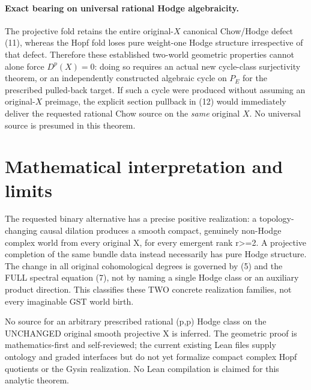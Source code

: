 \documentclass[11pt]{article}
\begin{document}
\paragraph{Exact bearing on universal rational Hodge algebraicity.}
The projective fold retains the entire original-$X$ canonical
Chow/Hodge defect (11), whereas the Hopf fold loses pure
weight-one Hodge structure irrespective of that defect.
Therefore these established two-world geometric properties cannot
alone force $D^p(X)=0$: doing so requires an actual new
cycle-class surjectivity theorem, or an independently constructed
algebraic cycle on $P_E$ for the prescribed pulled-back target.
If such a cycle were produced without assuming an original-$X$
preimage, the explicit section pullback in (12) would immediately
deliver the requested rational Chow source on the \emph{same}
original $X$. No universal source is presumed in this theorem.

\section{Mathematical interpretation and limits}
The requested binary alternative has a precise positive realization:
a topology-changing causal dilation produces a smooth compact,
genuinely non-Hodge complex world from every original X, for
every emergent rank r>=2. A projective completion of the same
bundle data instead necessarily has pure Hodge structure.
The change in all original cohomological degrees is governed
by (5) and the FULL spectral equation (7), not by naming
a single Hodge class or an auxiliary product direction.
This classifies these TWO concrete realization families, not
every imaginable GST world birth.

No source for an arbitrary prescribed rational (p,p) Hodge class
on the UNCHANGED original smooth projective X is inferred.
The geometric proof is mathematics-first and self-reviewed;
the current existing Lean files supply ontology and graded
interfaces but do not yet formalize compact complex Hopf
quotients or the Gysin realization. No Lean compilation is
claimed for this analytic theorem.
\end{document}

